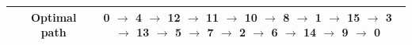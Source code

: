 \documentclass[preprint,5pt]{elsarticle}
\begin{document}
\begin{table}[htbp]
\begin{center}
\begin{tabular}{c c c}
                                               &\multicolumn{1}{c}{{\cellcolor[rgb]{0.729,0.729,0.729}}Optimal path} {\cellcolor[rgb]{0.729,0.729,0.729}}&0 $\rightarrow$ 4 $\rightarrow$ 12 $\rightarrow$ 11 $\rightarrow$ 10 $\rightarrow$ 8 $\rightarrow$ 1 $\rightarrow$ 15 $\rightarrow$ 3 $\rightarrow$ 13 $\rightarrow$ 5 $\rightarrow$ 7 $\rightarrow$ 2 $\rightarrow$ 6 $\rightarrow$ 14 $\rightarrow$ 9 $\rightarrow$ 0  \\ \hline\hline
\end{tabular}
\vspace{5pt}
\end{center}
\end{table}
\end{document}
